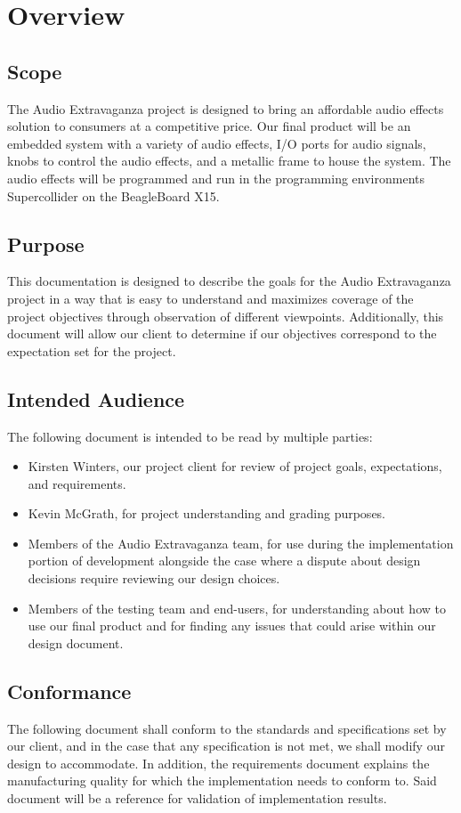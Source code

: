 \section{Overview}

\subsection{Scope}
The Audio Extravaganza project is designed to bring an affordable audio effects solution to consumers at a competitive price. Our final product will be an embedded system with a variety of audio effects, I/O ports for audio signals, knobs to control the audio effects, and a metallic frame to house the system. The audio effects will be programmed and run in the programming environments Supercollider on the BeagleBoard X15.

\subsection{Purpose}
This documentation is designed to describe the goals for the Audio Extravaganza project in a way that is easy to understand and maximizes coverage of the project objectives through observation of different viewpoints. Additionally, this document will allow our client to determine if our objectives correspond to the expectation set for the project.

\subsection{Intended Audience}
The following document is intended to be read by multiple parties:
\begin{itemize}
\item Kirsten Winters, our project client for review of project goals, expectations, and requirements.
\item Kevin McGrath, for project understanding and grading purposes.
\item Members of the Audio Extravaganza team, for use during the implementation portion of development alongside the case where a dispute about design decisions require reviewing our design choices.
\item Members of the testing team and end-users, for understanding about how to use our final product and for finding any issues that could arise within our design document.
\end{itemize}

\subsection{Conformance}
The following document shall conform to the standards and specifications set by our client, and in the case that any specification is not met, we shall modify our design to accommodate. In addition, the requirements document explains the manufacturing quality for which the implementation needs to conform to. Said document will be a reference for validation of implementation results. 